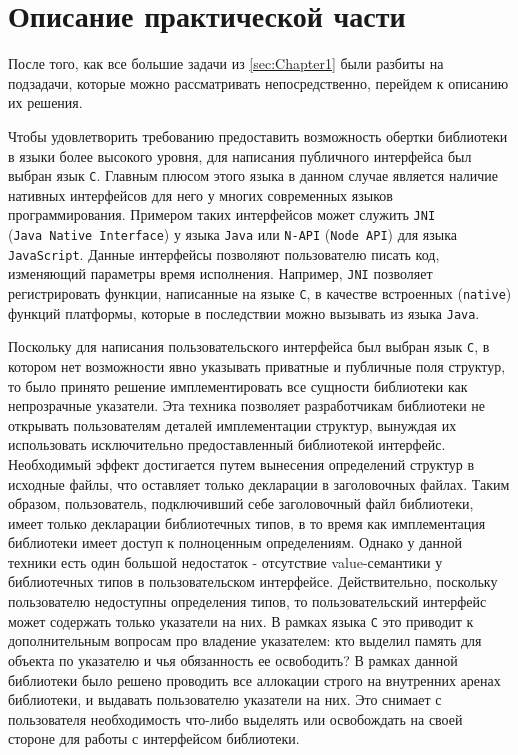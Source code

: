 \section{Описание практической части}
\label{sec:Chapter4} 

\sloppy

После того, как все большие задачи из \autoref{sec:Chapter1} были разбиты на подзадачи, которые можно рассматривать непосредственно, перейдем к описанию их решения.

Чтобы удовлетворить требованию предоставить возможность обертки библиотеки в языки более высокого уровня, для написания публичного интерфейса был выбран язык \texttt{C}. Главным плюсом этого языка в данном случае является наличие нативных интерфейсов для него у многих современных языков программирования. Примером таких интерфейсов может служить \texttt{JNI} (\texttt{Java~Native~Interface}) \cite{jni} у языка \texttt{Java} или \texttt{N-API} (\texttt{Node~API}) \cite{napi} для языка \texttt{JavaScript}. Данные интерфейсы позволяют пользователю писать код, изменяющий параметры время исполнения. Например, \texttt{JNI} позволяет регистрировать функции, написанные на языке \texttt{C}, в качестве встроенных (\texttt{native}) функций платформы, которые в последствии можно вызывать из языка \texttt{Java}.

Поскольку для написания пользовательского интерфейса был выбран язык \texttt{C}, в котором нет возможности явно указывать приватные и публичные поля структур, то было принято решение имплементировать все сущности библиотеки как непрозрачные указатели. Эта техника позволяет разработчикам библиотеки не открывать пользователям деталей имплементации структур, вынуждая их использовать исключительно предоставленный библиотекой интерфейс. Необходимый эффект достигается путем вынесения определений структур в исходные файлы, что оставляет только декларации в заголовочных файлах. Таким образом, пользователь, подключивший себе заголовочный файл библиотеки, имеет только декларации библиотечных типов, в то время как имплементация библиотеки имеет доступ к полноценным определениям. Однако у данной техники есть один большой недостаток - отсутствие value-семантики у библиотечных типов в пользовательском интерфейсе. Действительно, поскольку пользователю недоступны определения типов, то пользовательский интерфейс может содержать только указатели на них. В рамках языка \texttt{C} это приводит к дополнительным вопросам про владение указателем: кто выделил память для объекта по указателю и чья обязанность ее освободить? В рамках данной библиотеки было решено проводить все аллокации строго на внутренних аренах библиотеки, и выдавать пользователю указатели на них. Это снимает с пользователя необходимость что-либо выделять или освобождать на своей стороне для работы с интерфейсом библиотеки.

